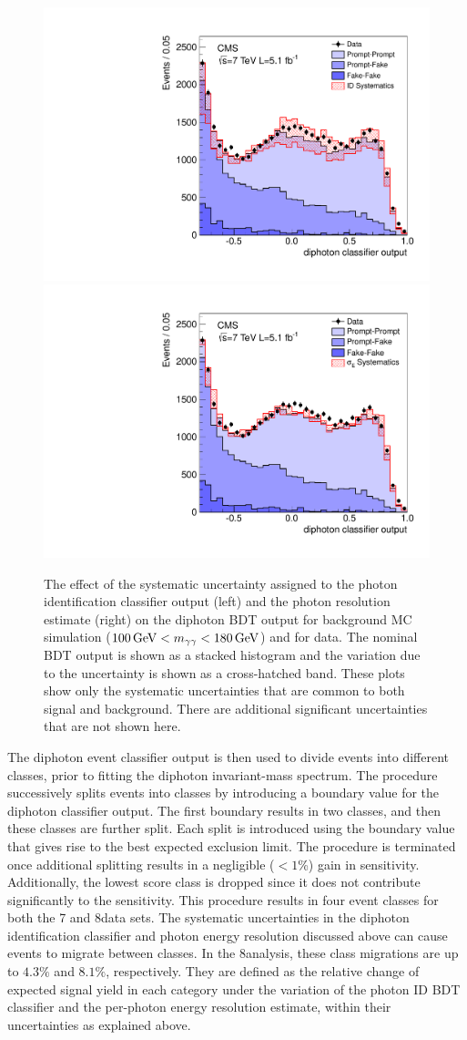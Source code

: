 \documentclass[12pt,twoside,a4paper,cmspaper,final,collab]{cms-tdr}
\begin{document}
\begin{figure}[htbp]
  \begin{center}
    \includegraphics[width=0.49\linewidth]{figures/hgg_phmvanomid_7TeV}
    \includegraphics[width=0.49\linewidth]{figures/hgg_phmvanomsige_7TeV}
    \caption{
      The effect of the systematic uncertainty assigned to the photon
      identification classifier output (left) and
      the photon resolution estimate (right)
      on the diphoton BDT output for background MC simulation ($100\,\text{Ge\hspace{-.08em}V}<m_{\gamma\gamma}<180\,\text{Ge\hspace{-.08em}V}$) and for data.
      The nominal BDT output is shown as a stacked histogram and the variation due to the
      uncertainty is shown as a cross-hatched band. These plots show only the systematic uncertainties
      that are common to both signal and background. There are additional significant uncertainties
      that are not shown here.
    }
    \label{fig:hgg_dpmvavalidation}
  \end{center}
\end{figure}


The diphoton event classifier output is then used to
divide events into different classes, prior to fitting the diphoton invariant-mass spectrum.
The procedure successively splits events into classes by
introducing a boundary value for the diphoton classifier output. The first boundary results in two classes,
and then these classes are further split.
Each split is introduced using the boundary value that gives rise to
the best expected exclusion limit. The procedure is terminated once additional
splitting results in a negligible (${<}1$\%) gain in sensitivity.
Additionally, the lowest score class is dropped since it does not
contribute significantly to the sensitivity. This procedure results
in four event classes for both the 7 and 8\TeV data sets. The systematic
uncertainties  in  the diphoton identification classifier and photon energy resolution
discussed above can cause
events to migrate between classes. In the 8\TeV analysis,
these class migrations are up to
$4.3\%$ and $8.1\%$, respectively. They are defined as the relative change of expected signal yield in
each category under the variation of the photon ID BDT classifier and the per-photon energy resolution estimate,
within their uncertainties as explained above.
\end{document}
